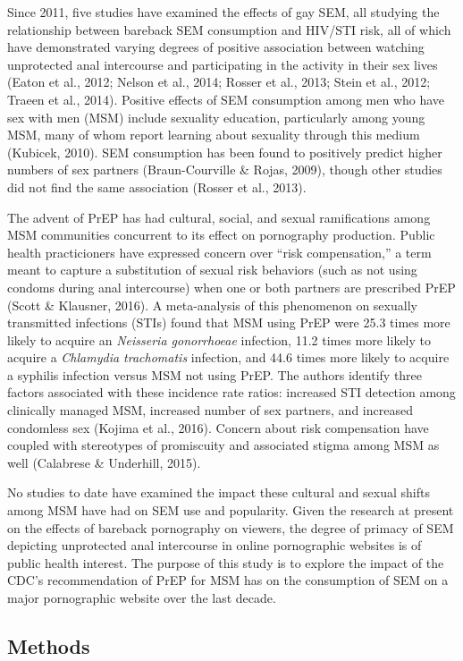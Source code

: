 \documentclass[]{article}
\begin{document}
Since 2011, five studies have examined the effects of gay SEM, all
studying the relationship between bareback SEM consumption and HIV/STI
risk, all of which have demonstrated varying degrees of positive
association between watching unprotected anal intercourse and
participating in the activity in their sex lives (Eaton et al., 2012;
Nelson et al., 2014; Rosser et al., 2013; Stein et al., 2012; Traeen et
al., 2014). Positive effects of SEM consumption among men who have sex
with men (MSM) include sexuality education, particularly among young
MSM, many of whom report learning about sexuality through this medium
(Kubicek, 2010). SEM consumption has been found to positively predict
higher numbers of sex partners (Braun-Courville \& Rojas, 2009), though
other studies did not find the same association (Rosser et al., 2013).

The advent of PrEP has had cultural, social, and sexual ramifications
among MSM communities concurrent to its effect on pornography
production. Public health practicioners have expressed concern over
``risk compensation,'' a term meant to capture a substitution of sexual
risk behaviors (such as not using condoms during anal intercourse) when
one or both partners are prescribed PrEP (Scott \& Klausner, 2016). A
meta-analysis of this phenomenon on sexually transmitted infections
(STIs) found that MSM using PrEP were 25.3 times more likely to acquire
an \emph{Neisseria gonorrhoeae} infection, 11.2 times more likely to
acquire a \emph{Chlamydia trachomatis} infection, and 44.6 times more
likely to acquire a syphilis infection versus MSM not using PrEP. The
authors identify three factors associated with these incidence rate
ratios: increased STI detection among clinically managed MSM, increased
number of sex partners, and increased condomless sex (Kojima et al.,
2016). Concern about risk compensation have coupled with stereotypes of
promiscuity and associated stigma among MSM as well (Calabrese \&
Underhill, 2015).

No studies to date have examined the impact these cultural and sexual
shifts among MSM have had on SEM use and popularity. Given the research
at present on the effects of bareback pornography on viewers, the degree
of primacy of SEM depicting unprotected anal intercourse in online
pornographic websites is of public health interest. The purpose of this
study is to explore the impact of the CDC's recommendation of PrEP for
MSM has on the consumption of SEM on a major pornographic website over
the last decade.

\subsection{Methods}\label{methods}
\end{document}
